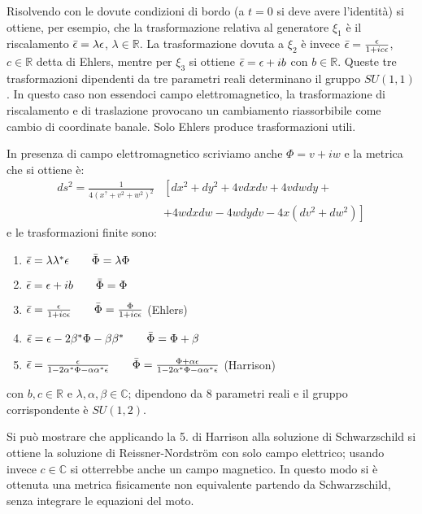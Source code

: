 Risolvendo con le dovute condizioni di bordo (a $t=0$ si deve avere l'identità) si ottiene, per esempio, che la trasformazione relativa al generatore $\xi_1$ è il riscalamento $\Bar{\epsilon} = \lambda\epsilon$, $\lambda \in \mathbb R$.
La trasformazione dovuta a $\xi_2$ è invece $\Bar{\epsilon} = \frac{\epsilon}{1 + ic\epsilon}$, $c \in \mathbb R$ detta di Ehlers, mentre per $\xi_3$ si ottiene $\Bar{\epsilon} = \epsilon + ib$ con $b\in\mathbb R$.
Queste tre trasformazioni dipendenti da tre parametri reali determinano il gruppo $SU(1,1)$.
In questo caso non essendoci campo elettromagnetico, la trasformazione di riscalamento e di traslazione provocano un cambiamento riassorbibile come cambio di coordinate banale. Solo Ehlers produce trasformazioni utili.

In presenza di campo elettromagnetico scriviamo anche $\Phi = v+ iw$  e la metrica che si ottiene è:
\begin{align*}
    ds^2 =\frac{1}{4(x^? + v^2 + w^2)^2}&\left[ dx^2 + dy^2 + 4vdxdv + 4vdwdy + \right.\\ &\left. + 4wdxdw -4wdydv - 4x(dv^2 + dw^2)\right]
\end{align*}
e le trasformazioni finite sono:
\begin{enumerate}
    \item $\Bar{\epsilon} = \lambda \lambda^*\epsilon \qquad \Bar{\Phi} = \lambda \Phi$
    \item  $\Bar{\epsilon} = \epsilon + ib \qquad \Bar{\Phi} = \Phi$
    \item $\Bar{\epsilon} = \frac{\epsilon}{1 +ic\epsilon} \qquad \Bar{\Phi} = \frac{\Phi}{1+ic\epsilon}$ (Ehlers)
    \item $\Bar{\epsilon} = \epsilon -2\beta^*\Phi - \beta\beta^* \qquad \Bar{\Phi} = \Phi + \beta$
    \item  $\Bar{\epsilon} = \frac{\epsilon}{1 - 2\alpha^*\Phi - \alpha\alpha^*\epsilon} \qquad \Bar{\Phi} = \frac{\Phi + \alpha\epsilon}{1-2\alpha^*\Phi-\alpha\alpha^*\epsilon}$ (Harrison)
\end{enumerate}
con $b, c \in \mathbb R$ e $\lambda, \alpha, \beta \in \mathbb C$; dipendono da 8 parametri reali e il gruppo corrispondente è $SU(1,2)$.

Si può mostrare che applicando la 5. di Harrison alla soluzione di Schwarzschild si ottiene la soluzione di Reissner-Nordstr\"om con solo campo elettrico; usando invece $c\in \mathbb C$ si otterrebbe anche un campo magnetico. In questo modo si è ottenuta una metrica fisicamente non equivalente partendo da Schwarzschild, senza integrare le equazioni del moto.
    
    
